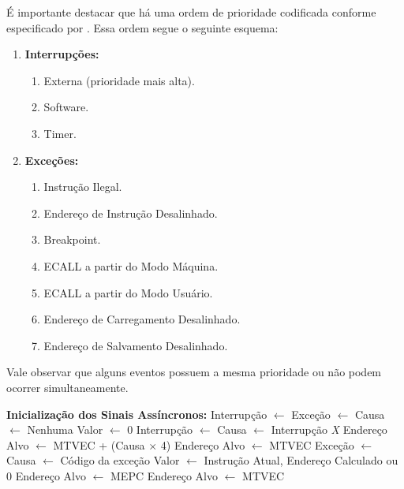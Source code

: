 \documentclass[
	12pt,				%
	openright,			%
	oneside,			%
	a4paper,			%
	english,			%
	french,				%
	spanish,			%
	brazil,				%
	]{abntex2}
\begin{document}
É importante destacar que há uma ordem de prioridade codificada conforme especificado por . Essa ordem segue o seguinte esquema:
\begin{enumerate}
    \item \textbf{Interrupções:}
    \begin{enumerate}
        \item Externa (prioridade mais alta).
        \item Software.
        \item Timer.
    \end{enumerate}
    \item \textbf{Exceções:}
    \begin{enumerate}
        \item Instrução Ilegal.
        \item Endereço de Instrução Desalinhado.
        \item Breakpoint.
        \item ECALL a partir do Modo Máquina.
        \item ECALL a partir do Modo Usuário.
        \item Endereço de Carregamento Desalinhado.
        \item Endereço de Salvamento Desalinhado.
    \end{enumerate}
\end{enumerate}

Vale observar que alguns eventos possuem a mesma prioridade ou não podem ocorrer simultaneamente.

\begin{algorithm}[H]
\caption{Rotina Assíncrona do Controlador de CSR}
\label{alg:rotina_assincrona}
\begin{algorithmic}[1]
    \STATE \textbf{Inicialização dos Sinais Assíncronos:}
    \STATE \hspace{1em} Interrupção $\leftarrow$ \FALSE
    \STATE \hspace{1em} Exceção $\leftarrow$ \FALSE
    \STATE \hspace{1em} Causa $\leftarrow$ Nenhuma
    \STATE \hspace{1em} Valor $\leftarrow$ 0
    \STATE
            \STATE Interrupção $\leftarrow$ \TRUE
            \STATE Causa $\leftarrow$ Interrupção \textit{X}
        \ENDIF
    \ENDIF
    \STATE
            \STATE Endereço Alvo $\leftarrow$ MTVEC + (Causa $\times$ 4)
        \ELSE
            \STATE Endereço Alvo $\leftarrow$ MTVEC
        \ENDIF
        \STATE Exceção $\leftarrow$ \TRUE
        \STATE Causa $\leftarrow$ Código da exceção
        \STATE Valor $\leftarrow$ Instrução Atual, Endereço Calculado ou 0
        \STATE Endereço Alvo $\leftarrow$ MEPC
    \ENDIF
    \STATE
        \STATE Endereço Alvo $\leftarrow$ MTVEC
    \ENDIF
\end{algorithmic}
\end{algorithm}
\end{document}
